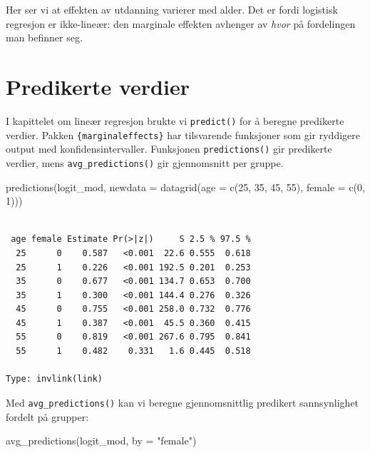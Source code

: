 \documentclass[
  norsk,
  letterpaper,
  DIV=11,
  numbers=noendperiod]{scrreprt}
\newenvironment{Shaded}{\begin{snugshade}}{\end{snugshade}}
\newcommand{\AttributeTok}[1]{\textcolor[rgb]{0.40,0.45,0.13}{#1}}
\newcommand{\DecValTok}[1]{\textcolor[rgb]{0.68,0.00,0.00}{#1}}
\newcommand{\FunctionTok}[1]{\textcolor[rgb]{0.28,0.35,0.67}{#1}}
\newcommand{\NormalTok}[1]{\textcolor[rgb]{0.00,0.23,0.31}{#1}}
\newcommand{\StringTok}[1]{\textcolor[rgb]{0.13,0.47,0.30}{#1}}
\theoremstyle{definition}
\theoremstyle{remark}
\begin{document}
Her ser vi at effekten av utdanning varierer med alder. Det er fordi
logistisk regresjon er ikke-lineær: den marginale effekten avhenger av
\emph{hvor} på fordelingen man befinner seg.

\section{Predikerte verdier}\label{predikerte-verdier}

I kapittelet om lineær regresjon brukte vi \texttt{predict()} for å
beregne predikerte verdier. Pakken \texttt{\{marginaleffects\}} har
tilsvarende funksjoner som gir ryddigere output med
konfidensintervaller. Funksjonen \texttt{predictions()} gir predikerte
verdier, mens \texttt{avg\_predictions()} gir gjennomsnitt per gruppe.

\begin{Shaded}
\begin{Highlighting}[]
\FunctionTok{predictions}\NormalTok{(logit\_mod,}
            \AttributeTok{newdata =} \FunctionTok{datagrid}\NormalTok{(}\AttributeTok{age =} \FunctionTok{c}\NormalTok{(}\DecValTok{25}\NormalTok{, }\DecValTok{35}\NormalTok{, }\DecValTok{45}\NormalTok{, }\DecValTok{55}\NormalTok{),}
                               \AttributeTok{female =} \FunctionTok{c}\NormalTok{(}\DecValTok{0}\NormalTok{, }\DecValTok{1}\NormalTok{)))}
\end{Highlighting}
\end{Shaded}

\begin{verbatim}

 age female Estimate Pr(>|z|)     S 2.5 % 97.5 %
  25      0    0.587   <0.001  22.6 0.555  0.618
  25      1    0.226   <0.001 192.5 0.201  0.253
  35      0    0.677   <0.001 134.7 0.653  0.700
  35      1    0.300   <0.001 144.4 0.276  0.326
  45      0    0.755   <0.001 258.0 0.732  0.776
  45      1    0.387   <0.001  45.5 0.360  0.415
  55      0    0.819   <0.001 267.6 0.795  0.841
  55      1    0.482    0.331   1.6 0.445  0.518

Type: invlink(link)
\end{verbatim}

Med \texttt{avg\_predictions()} kan vi beregne gjennomsnittlig predikert
sannsynlighet fordelt på grupper:

\begin{Shaded}
\begin{Highlighting}[]
\FunctionTok{avg\_predictions}\NormalTok{(logit\_mod, }\AttributeTok{by =} \StringTok{"female"}\NormalTok{)}
\end{Highlighting}
\end{Shaded}
\end{document}
